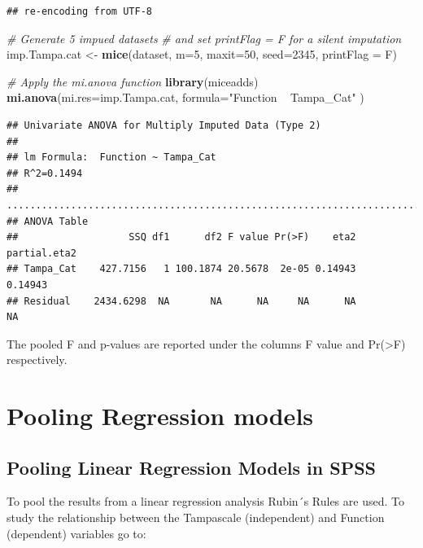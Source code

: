 \documentclass[]{book}
\newenvironment{Shaded}{\begin{snugshade}}{\end{snugshade}}
\newcommand{\KeywordTok}[1]{\textcolor[rgb]{0.13,0.29,0.53}{\textbf{#1}}}
\newcommand{\DataTypeTok}[1]{\textcolor[rgb]{0.13,0.29,0.53}{#1}}
\newcommand{\DecValTok}[1]{\textcolor[rgb]{0.00,0.00,0.81}{#1}}
\newcommand{\StringTok}[1]{\textcolor[rgb]{0.31,0.60,0.02}{#1}}
\newcommand{\CommentTok}[1]{\textcolor[rgb]{0.56,0.35,0.01}{\textit{#1}}}
\newcommand{\NormalTok}[1]{#1}
\theoremstyle{definition}
\theoremstyle{definition}
\theoremstyle{definition}
\theoremstyle{remark}
\begin{document}
\begin{verbatim}
## re-encoding from UTF-8
\end{verbatim}

\begin{Shaded}
\begin{Highlighting}[]
\CommentTok{# Generate 5 impued datasets }
\CommentTok{# and set printFlag = F for a silent imputation}
\NormalTok{imp.Tampa.cat <-}\StringTok{ }\KeywordTok{mice}\NormalTok{(dataset, }\DataTypeTok{m=}\DecValTok{5}\NormalTok{, }\DataTypeTok{maxit=}\DecValTok{50}\NormalTok{, }\DataTypeTok{seed=}\DecValTok{2345}\NormalTok{, }\DataTypeTok{printFlag =}\NormalTok{ F)}

\CommentTok{# Apply the mi.anova function}
\KeywordTok{library}\NormalTok{(miceadds)}
\KeywordTok{mi.anova}\NormalTok{(}\DataTypeTok{mi.res=}\NormalTok{imp.Tampa.cat, }\DataTypeTok{formula=}\StringTok{"Function ~ Tampa_Cat"}\NormalTok{ )}
\end{Highlighting}
\end{Shaded}

\begin{verbatim}
## Univariate ANOVA for Multiply Imputed Data (Type 2)  
## 
## lm Formula:  Function ~ Tampa_Cat
## R^2=0.1494 
## ..........................................................................
## ANOVA Table 
##                   SSQ df1      df2 F value Pr(>F)    eta2 partial.eta2
## Tampa_Cat    427.7156   1 100.1874 20.5678  2e-05 0.14943      0.14943
## Residual    2434.6298  NA       NA      NA     NA      NA           NA
\end{verbatim}

The pooled F and p-values are reported under the columns F value and
Pr(\textgreater{}F) respectively.

\section{Pooling Regression models}\label{pooling-regression-models}

\subsection{Pooling Linear Regression Models in
SPSS}\label{pooling-linear-regression-models-in-spss}

To pool the results from a linear regression analysis Rubin´s Rules are
used. To study the relationship between the Tampascale (independent) and
Function (dependent) variables go to:
\end{document}
